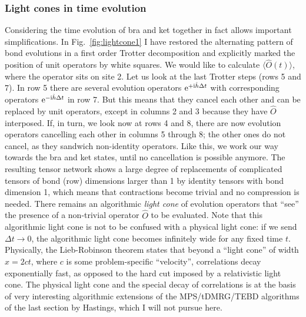 \documentclass[a4paper,10pt,oneside,onecolumn,1p,times]{elsarticle}
\newcommand{\eul}{{\rm e }}
\newcommand{\imag}{{\rm i }}
\begin{document}
\subsubsection{Light cones in time evolution}
Considering the time evolution of bra and ket together in fact allows important simplifications. In Fig.~\ref{fig:lightcone1} I have restored the alternating pattern of bond evolutions in a first order Trotter decomposition and explicitly marked the position of unit operators by white squares. We would like to calculate $\langle \hat{O}(t) \rangle$, where the operator sits on site 2. Let us look at the last Trotter steps (rows 5 and 7). In row 5 there are several evolution operators $\eul^{+\imag \hat{h} \Delta t}$ with corresponding operators  $\eul^{-\imag \hat{h} \Delta t}$ in row 7. But this means that they cancel each other and can be replaced by unit operators, except in columns 2 and 3 because they have $\hat{O}$ interposed. If, in turn, we look now at rows 4 and 8, there are now evolution operators cancelling each other in columns 5 through 8; the other ones do not cancel, as they sandwich non-identity operators. Like this, we work our way towards the bra and ket states, until no cancellation is possible anymore. The resulting tensor network shows a large degree of replacements of complicated tensors of bond (row) dimensions larger than 1 by identity tensors with bond dimension 1, which means that contractions become trivial and no compression is needed. There remains an algorithmic {\em light cone} of evolution operators that ``see'' the presence of a non-trivial operator $\hat{O}$ to be evaluated. Note that this algorithmic light cone is not to be confused with a physical light cone: if we send $\Delta t\rightarrow 0$, the algorithmic light cone becomes infinitely wide for any fixed time $t$. Physically, the Lieb-Robinson theorem states that beyond a ``light cone'' of width $x=2ct$, where $c$ is some problem-specific ``velocity'', correlations decay exponentially fast, as opposed to the hard cut imposed by a relativistic light cone. The physical light cone and the special decay of correlations is at the basis of very interesting algorithmic extensions of the MPS/tDMRG/TEBD algorithms of the last section by Hastings\cite{Hastings09,Hastings08}, which I will not pursue here.
\end{document}
